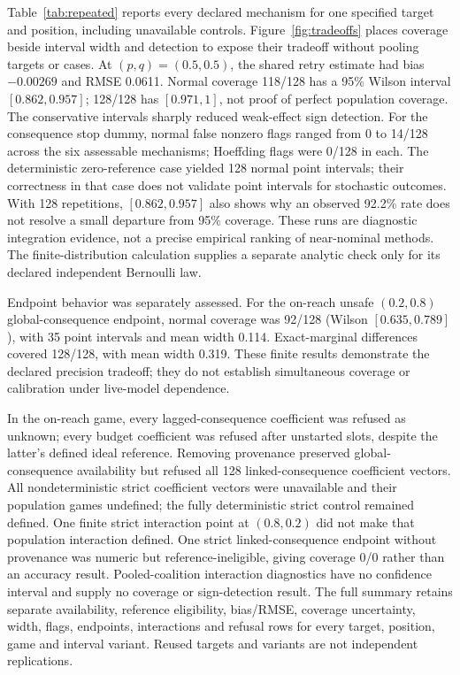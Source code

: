 \documentclass[conference]{IEEEtran}
\begin{document}
Table~\ref{tab:repeated} reports every declared mechanism for one specified
target and position, including unavailable controls.
Figure~\ref{fig:tradeoffs} places coverage beside interval width and detection
to expose their tradeoff without pooling targets or cases. At $(p,q)=(0.5,0.5)$,
the shared retry estimate had bias $-0.00269$ and RMSE 0.0611. Normal coverage
118/128 has a 95\% Wilson interval $[0.862,0.957]$; 128/128 has
$[0.971,1]$, not proof of perfect population coverage. The conservative
intervals sharply reduced weak-effect sign detection. For the consequence
stop dummy, normal false nonzero flags ranged from 0 to 14/128 across the six
assessable mechanisms; Hoeffding flags were 0/128 in each. The deterministic
zero-reference case yielded 128 normal point intervals; their correctness in
that case does not validate point intervals for stochastic outcomes.
With 128 repetitions, $[0.862,0.957]$ also shows why an observed 92.2\% rate
does not resolve a small departure from 95\% coverage. These runs are diagnostic
integration evidence, not a precise empirical ranking of near-nominal methods.
The finite-distribution calculation supplies a separate analytic check only
for its declared independent Bernoulli law.

Endpoint behavior was separately assessed. For the on-reach unsafe
$(0.2,0.8)$ global-consequence endpoint,
normal coverage was 92/128 (Wilson $[0.635,0.789]$), with 35 point intervals
and mean width 0.114. Exact-marginal differences covered 128/128, with mean
width 0.319. These finite results demonstrate the declared precision tradeoff;
they do not establish simultaneous coverage or calibration under live-model
dependence.

In the on-reach game, every lagged-consequence coefficient was refused as
unknown; every budget
coefficient was refused after unstarted slots, despite the latter's defined
ideal reference. Removing provenance preserved global-consequence availability
but refused all 128 linked-consequence coefficient vectors. All nondeterministic strict
coefficient vectors were unavailable and their population games undefined;
the fully deterministic strict control remained defined. One finite strict
interaction point at $(0.8,0.2)$ did not make that population interaction
defined. One strict linked-consequence endpoint without provenance was numeric
but reference-ineligible, giving coverage 0/0 rather than an accuracy result.
Pooled-coalition interaction diagnostics have no confidence interval
and supply no coverage or sign-detection result. The full summary retains
separate availability, reference eligibility, bias/RMSE, coverage uncertainty,
width, flags, endpoints, interactions and refusal rows for every target,
position, game and interval variant. Reused targets and variants are not
independent replications.
\end{document}
